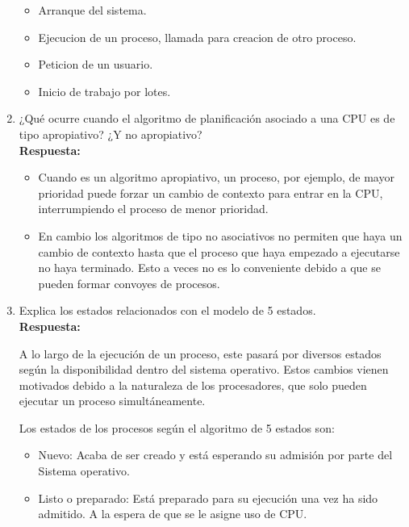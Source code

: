 \documentclass[a4paper,12pt]{article}
\begin{document}
\begin{enumerate}[label=\textbf{Pregunta \arabic*.}]
    \begin{itemize}
        \item Arranque del sistema.
        \item Ejecucion de un proceso, llamada para creacion de otro proceso.
        \item Peticion de un usuario.
        \item Inicio de trabajo por lotes.
    \end{itemize}

    \item ¿Qué ocurre cuando el algoritmo de planificación asociado a una CPU es de tipo apropiativo? ¿Y no apropiativo? \\
    \textbf{Respuesta:}

    \begin{itemize}
         
    \item Cuando es un algoritmo apropiativo, un proceso, por ejemplo, de mayor prioridad puede forzar un cambio de contexto para entrar en la CPU, interrumpiendo el proceso de menor prioridad.

    \item En cambio los algoritmos de tipo no asociativos no permiten que haya un cambio de contexto hasta que el proceso que haya empezado a ejecutarse no haya terminado. Esto a veces no es lo conveniente debido a que se pueden formar convoyes de procesos.

    \end{itemize}


    \item Explica los estados relacionados con el modelo de 5 estados. \\ %
    \textbf{Respuesta:}


    A lo largo de la ejecución de un proceso, este pasará por diversos estados según la disponibilidad dentro del sistema operativo. Estos cambios vienen motivados debido a la naturaleza de los procesadores, que solo pueden ejecutar un proceso simultáneamente.

    Los estados de los procesos según el algoritmo de 5 estados son:

    \begin{itemize}
    
    \item Nuevo: Acaba de ser creado y está esperando su admisión por parte del Sistema operativo.

    \item Listo o preparado: Está preparado para su ejecución una vez ha sido admitido. A la espera de que se le asigne uso de CPU.


\end{itemize}
\end{enumerate}
\end{document}
